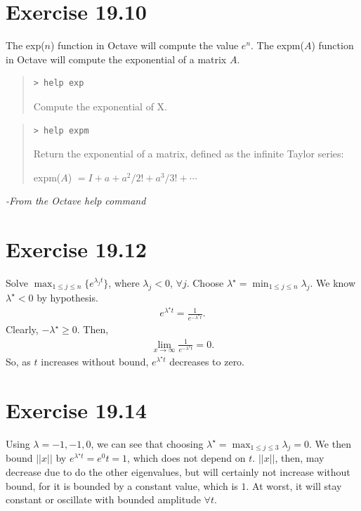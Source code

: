\documentclass[11pt]{article}
\begin{document}
\section*{Exercise 19.10}
The exp($n$) function in Octave will compute the value $e^{n}$.
The expm($A$) function in Octave will compute the exponential of a matrix $A$.
\begin{quote}
    \begin{verbatim}> help exp \end{verbatim}

    Compute the exponential of X.
\end{quote}
\begin{quote}
    \begin{verbatim}> help expm \end{verbatim}

    Return the exponential of a matrix, defined as the infinite Taylor
    series:

          expm($A$) $= I + a + a^2/2! + a^3/3! + \cdots $
\end{quote}
\emph{-From the Octave help command}

\section*{Exercise 19.12}
Solve $\displaystyle\max_{1\leq j \leq n} \{e^{\lambda_j t}\}$, where $\lambda_j < 0$, $ \forall j$. Choose $\lambda^{\star} = 
\displaystyle\min_{1 \leq j \leq n} \lambda_j$. We know $\lambda^{\star} < 0$ by hypothesis. 
\begin{align*}
    e^{\lambda^{\star} t} = \frac{1}{e^{-\lambda^{\star}t}}.
\end{align*}
Clearly, $-\lambda^{\star} \ge 0$. Then,
\begin{align*}
    \displaystyle\lim_{x\to\infty} \frac{1}{e^{-\lambda^{\star}t}} = 0.
\end{align*}
So, as $t$ increases without bound, $e^{\lambda^{\star}t}$ decreases to zero.

\qedsymbol

\section*{Exercise 19.14}
Using $\lambda = -1, -1, 0$, we can see that choosing $\lambda^{\star} =
\displaystyle\max_{1 \leq j \leq 3} {\lambda_j} = 0$. We then bound 
$||x||$ by $e^{\lambda^{\star} t} = e^0t = 1$, which does not depend on
$t$. $||x||$, then, may decrease due to do the other eigenvalues, but
will certainly not increase without bound, for it is bounded by a constant
value, which is $1$. At worst, it will stay constant or oscillate with bounded
amplitude $\forall t$. 
\end{document}
